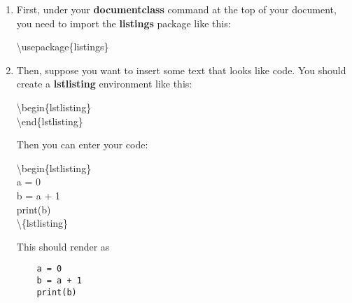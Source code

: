 \documentclass[11pt,onecolumn]{article}
\theoremstyle{definition}
\begin{document}
\begin{enumerate}
    \item First, under your \textbf{documentclass} command at the top of your document, you need to import the \textbf{listings} package like this:
    
    \begin{tcolorbox}
        \textbackslash usepackage\{listings\}
    \end{tcolorbox}
    
    \item Then, suppose you want to insert some text that looks like code. You should create a \textbf{lstlisting} environment like this:
    
    \begin{tcolorbox}
        \textbackslash begin\{lstlisting\}\\
        \textbackslash end\{lstlisting\}
    \end{tcolorbox}
    
    Then you can enter your code:
    
    \begin{tcolorbox}
        \textbackslash begin\{lstlisting\}\\
        a = 0\\
        b = a + 1\\
        print(b)\\
        \textbackslash \{lstlisting\}
    \end{tcolorbox}
    
    This should render as
    
    \begin{lstlisting}
    a = 0
    b = a + 1
    print(b)
    \end{lstlisting}
    
\end{enumerate}
\end{document}

